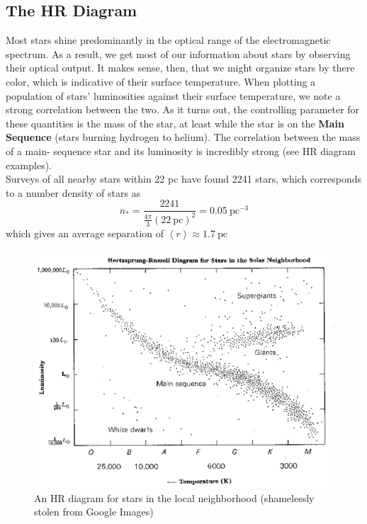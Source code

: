 \documentclass[10pt]{article}
\numberwithin{equation}{section}
\newcommand{\n}{\noindent}
\newcommand{\avg}[1]{\left\langle#1\right\rangle}
\begin{document}

	\subsection{The HR Diagram} 
	Most stars shine predominantly in the optical range of the 
electromagnetic spectrum. As a result, we get most of our information about 
stars by observing their optical output.  It makes sense, then, that we 
might organize stars by there color, which is indicative of their surface 
temperature. When plotting a population of stars' luminosities against 
their surface temperature, we note a strong correlation between the two. As 
it turns out, the controlling parameter for these quantities is the mass of 
the star, at least while the star is on the \textbf{Main Sequence} (stars 
burning hydrogen to helium). The correlation between the mass of a main-
sequence star and its luminosity is incredibly strong (see HR diagram 
examples).\\

\n Surveys of all nearby stars within 22 pc have found 2241 stars, which
corresponds to a number density of stars as
\begin{equation}
	\label{eq:hr:1} n_* = \frac{2241}{\frac{4\pi}{3}(22\ \mathrm{pc})^2} = 0.05\
\mathrm{pc}^{-3}
\end{equation}
which gives an average separation of $\avg{r}\approx 1.7\ \mathrm{pc}$
	\begin{figure}
		\centering
		\includegraphics[width=6in]{hr_local.pdf}
		\caption{An HR diagram for stars in the local neighborhood 
(shamelessly stolen from Google Images)}
		\label{HR.1f}
	\end{figure}
\end{document}
